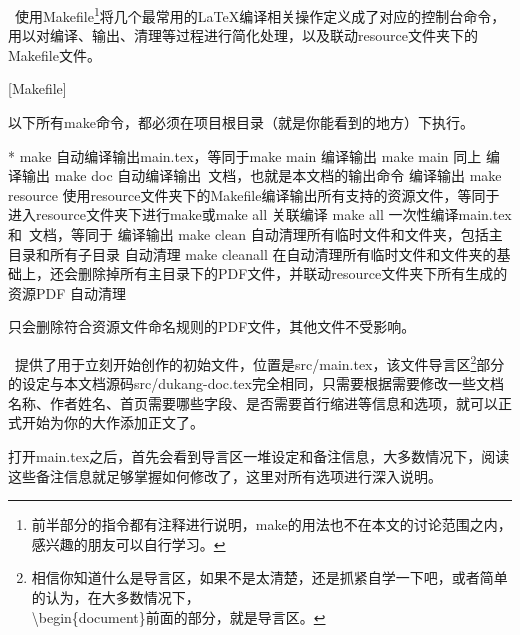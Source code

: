 \dk~使用Makefile\footnote{前半部分的指令都有注释进行说明，make的用法也不在本文的讨论范围之内，感兴趣的朋友可以自行学习。}将几个最常用的{\LaTeX}编译相关操作定义成了对应的控制台命令，用以对编译、输出、清理等过程进行简化处理，以及联动resource文件夹下的Makefile文件。

[Makefile]

\begin{dkcomment}
  以下所有make命令，都必须在项目根目录（就是你能看到的地方）下执行。
\end{dkcomment}

\begin{cvhonors}*
  \cvhonor
  {make}
  {自动编译输出main.tex，等同于make main}
  {编译输出}
  \cvhonor
  {make main}
  {同上}
  {编译输出}
  \cvhonor
  {make doc}
  {自动编译输出\dk~文档，也就是本文档的输出命令}
  {编译输出}
  \cvhonor
  {make resource}
  {使用resource文件夹下的Makefile编译输出所有支持的资源文件，等同于进入resource文件夹下进行make或make all}
  {关联编译}
  \cvhonor
  {make all}
  {一次性编译main.tex和\dk~文档，等同于}
  {编译输出}
  \cvhonor
  {make clean}
  {自动清理所有临时文件和文件夹，包括主目录和所有子目录}
  {自动清理}
  \cvhonor
  {make cleanall}
  {在自动清理所有临时文件和文件夹的基础上，还会删除掉所有主目录下的PDF文件，并联动resource文件夹下所有生成的资源PDF}
  {自动清理}
\end{cvhonors}

\begin{dkcomment}
  只会删除符合资源文件命名规则的PDF文件，其他文件不受影响。
\end{dkcomment}

\dk~提供了用于立刻开始创作的初始文件，位置是src/main.tex，该文件导言区\footnote{相信你知道什么是导言区，如果不是太清楚，还是抓紧自学一下吧，或者简单的认为，在大多数情况下，\\\textbackslash begin\{document\}前面的部分，就是导言区。}部分的设定与本文档源码src/dukang-doc.tex完全相同，只需要根据需要修改一些文档名称、作者姓名、首页需要哪些字段、是否需要首行缩进等信息和选项，就可以正式开始为你的大作添加正文了。

打开main.tex之后，首先会看到导言区一堆设定和备注信息，大多数情况下，阅读这些备注信息就足够掌握如何修改了，这里对所有选项进行深入说明。


